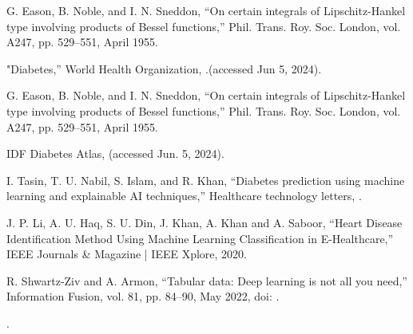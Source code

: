 \documentclass[conference]{IEEEtran}
\begin{document}
\begin{thebibliography}{00}
 G. Eason, B. Noble, and I. N. Sneddon, ``On certain integrals of Lipschitz-Hankel type involving products of Bessel functions,'' Phil. Trans. Roy. Soc. London, vol. A247, pp. 529--551, April 1955.

 "Diabetes,” World Health Organization, .(accessed Jun 5, 2024).

 G. Eason, B. Noble, and I. N. Sneddon, ``On certain integrals of Lipschitz-Hankel type involving products of Bessel functions,'' Phil. Trans. Roy. Soc. London, vol. A247, pp. 529--551, April 1955.

IDF Diabetes Atlas,  (accessed Jun. 5, 2024).

I. Tasin, T. U. Nabil, S. Islam, and R. Khan, “Diabetes prediction using machine learning and explainable AI techniques,” Healthcare technology letters, 
. 

 J. P. Li, A. U. Haq, S. U. Din, J. Khan, A. Khan and A. Saboor, “Heart Disease Identification Method Using Machine Learning Classification in E-Healthcare,” IEEE Journals \& Magazine | IEEE Xplore, 2020. 


 R. Shwartz-Ziv and A. Armon, “Tabular data: Deep learning is not all you need,” Information Fusion, vol. 81, pp. 84–90, May 2022, doi: 
.

.


\end{thebibliography}
\end{document}
